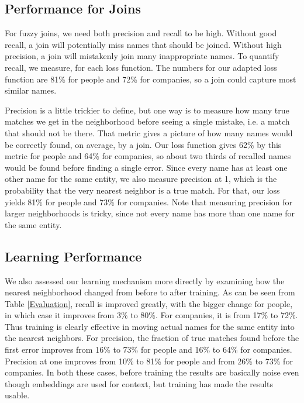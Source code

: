 \subsection{Performance for Joins}

 For fuzzy joins, we need both precision and recall to be high.  Without good recall, a join will potentially miss names that should be joined.  Without high precision, a join will mistakenly join many inappropriate names.  To quantify recall, we measure, for each loss function.  The numbers for our adapted loss function are 81\% for people and 72\% for companies, so a join could capture most similar names.

 Precision is a little trickier to define, but one way is to measure how many true matches we get in the neighborhood before seeing a single mistake, i.e. a match that should not be there.  That metric gives a picture of how many names would be correctly found, on average, by a join.  Our loss function gives 62\% by this metric for people and 64\% for companies, so about two thirds of recalled names would be found before finding a single error.  Since every name has at least one other name for the same entity, we also measure precision at 1, which is the probability that the very nearest neighbor is a true match.  For that, our loss yields 81\% for people and 73\% for companies.  Note that measuring precision for larger neighborhoods is tricky, since not every name has more than one name for the same entity.

\subsection{Learning Performance}

 We also assessed our learning mechanism more directly by examining how the nearest neighborhood changed from before to after training.  As can be seen from Table \ref{Evaluation}, recall is improved greatly, with the bigger change for people, in which case it improves from 3\% to 80\%.  For companies, it is from 17\% to 72\%.  Thus training is clearly effective in moving actual names for the same entity into the nearest neighbors.  For precision, the fraction of true matches found before the first error improves from 16\% to 73\% for people and 16\% to 64\% for companies.  Precision at one improves from 10\% to 81\% for people and from 26\% to 73\% for companies.  In both these cases, before training the results are basically noise even though embeddings are used for context, but training has made the results usable.

